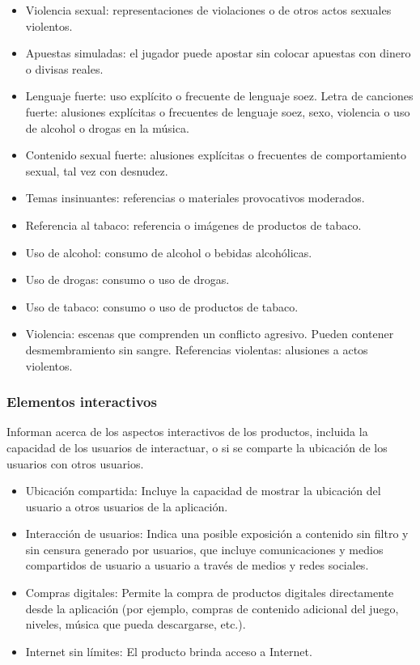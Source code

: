 \documentclass{article}
\begin{document}
\begin{itemize}
				\item Violencia sexual: representaciones de violaciones o de otros actos sexuales violentos.
				\item Apuestas simuladas: el jugador puede apostar sin colocar apuestas con dinero o divisas reales.
				\item Lenguaje fuerte: uso explícito o frecuente de lenguaje soez.
				Letra de canciones fuerte: alusiones explícitas o frecuentes de lenguaje soez, sexo, violencia o uso de alcohol o drogas en la música.
				\item Contenido sexual fuerte: alusiones explícitas o frecuentes de comportamiento sexual, tal vez con desnudez.
				\item Temas insinuantes: referencias o materiales provocativos moderados.
				\item Referencia al tabaco: referencia o imágenes de productos de tabaco.
				\item Uso de alcohol: consumo de alcohol o bebidas alcohólicas.
				\item Uso de drogas: consumo o uso de drogas.
				\item Uso de tabaco: consumo o uso de productos de tabaco.
				\item Violencia: escenas que comprenden un conflicto agresivo. Pueden contener desmembramiento sin sangre.
				Referencias violentas: alusiones a actos violentos.
			\end{itemize}
			
			\subsubsection{Elementos interactivos} 
			Informan acerca de los aspectos interactivos de los productos, incluida la capacidad de los usuarios de interactuar, o si se comparte la ubicación de los usuarios con otros usuarios.
			
			\begin{itemize}
			
			\item Ubicación compartida: Incluye la capacidad de mostrar la ubicación del usuario a otros usuarios de la aplicación.
			\item Interacción de usuarios: Indica una posible exposición a contenido sin filtro y sin censura generado por usuarios, que incluye comunicaciones y medios compartidos de usuario a usuario a través de medios y redes sociales.
			\item Compras digitales: Permite la compra de productos digitales directamente desde la aplicación (por ejemplo, compras de contenido adicional del juego, niveles, música que pueda descargarse, etc.).
			\item Internet sin límites: El producto brinda acceso a Internet.
		\end{itemize}
		
\end{document}

